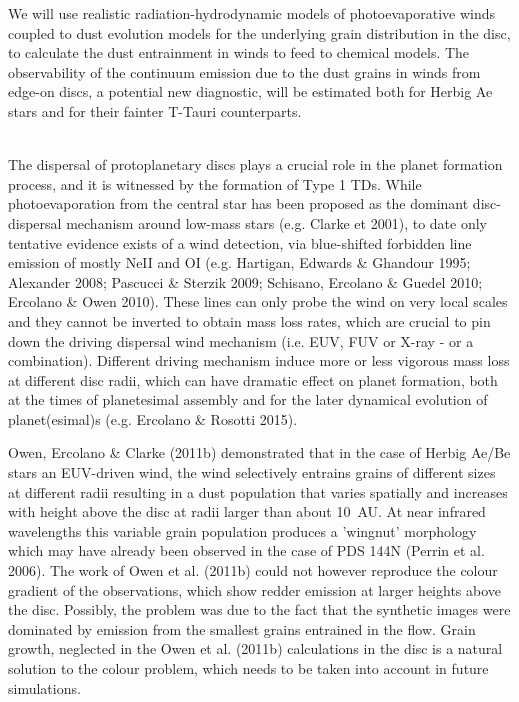 We will use realistic radiation-hydrodynamic models of
photoevaporative winds coupled to dust evolution models for the
underlying grain distribution in the disc, to calculate the dust
entrainment in winds to feed to chemical models. The observability of
the continuum emission due to the dust grains in winds from edge-on
discs, a potential new diagnostic, will be estimated both for Herbig
Ae stars and for their fainter T-Tauri counterparts.  

\vspace{0.5em}
\\
The dispersal of protoplanetary discs plays a crucial role in the
planet formation process, and it is witnessed by the formation of Type
1 TDs. While photoevaporation from the central star has been proposed
as the dominant disc-dispersal mechanism around low-mass stars
(e.g. Clarke et 2001), to date only tentative evidence exists of a
wind detection, via blue-shifted forbidden line emission of mostly
NeII and OI (e.g. Hartigan, Edwards \& Ghandour 1995; Alexander 2008;
Pascucci \& Sterzik 2009; Schisano, Ercolano \& Guedel 2010; Ercolano
\& Owen 2010). These lines can only probe the wind on very local
scales and they cannot be inverted to obtain mass loss rates, which
are crucial to pin down the driving dispersal wind mechanism
(i.e. EUV, FUV or X-ray - or a combination). Different driving
mechanism induce more or less vigorous mass loss at different disc
radii, which  can have dramatic effect on planet formation, both at
the times of planetesimal assembly and for the later dynamical
evolution of planet(esimal)s (e.g. Ercolano \& Rosotti 2015).  

Owen, Ercolano \& Clarke (2011b) demonstrated that in the case of
Herbig Ae/Be stars an EUV-driven wind, the wind selectively entrains
grains of different sizes at different radii resulting in a dust
population that varies spatially and increases with height above the
disc at radii larger than about 10~AU. At near infrared wavelengths
this variable grain population produces a 'wingnut' morphology which
may have already been observed in the case of PDS 144N (Perrin et
al. 2006). The work of Owen et al. (2011b) could not however reproduce
the colour gradient of the observations, which show redder emission at
larger heights above the disc. Possibly, the problem was due to the
fact that the synthetic images were dominated by emission from the
smallest grains entrained in the flow. Grain growth, neglected in the
Owen et al. (2011b) calculations in the disc is a natural solution to
the colour problem, which needs to be taken into account in future
simulations.  

